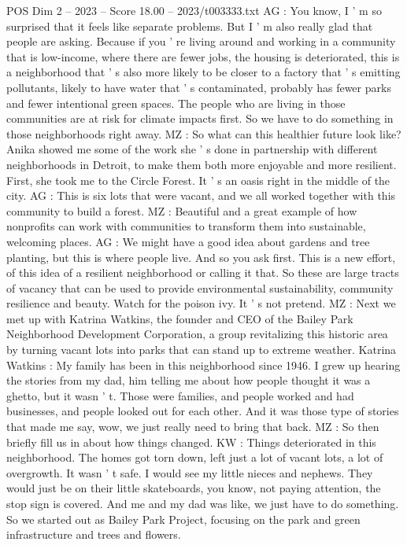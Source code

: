 \begin{textsample}{POS Dim 2 – 2023 – Score 18.00 – 2023/t003333.txt}
AG : You know, I ' m so surprised that it feels like separate problems.
But I ' m also really glad that people are asking.
Because if you ' re living around and working in a community that is low-income, where there are fewer jobs, the housing is deteriorated, this is a neighborhood that ' s also more likely to be closer to a factory that ' s emitting pollutants, likely to have water that ' s contaminated, probably has fewer parks and fewer intentional green spaces.
The people who are living in those communities are at risk for climate impacts first.
So we have to do something in those neighborhoods right away.
MZ : So what can this healthier future look like?
Anika showed me some of the work she ' s done in partnership with different neighborhoods in Detroit, to make them both more enjoyable and more resilient.
First, she took me to the Circle Forest.
It ' s an oasis right in the middle of the city.
AG : This is six lots that were vacant, and we all worked together with this community to build a forest.
MZ : Beautiful and a great example of how nonprofits can work with communities to transform them into sustainable, welcoming places.
AG : We might have a good idea about gardens and tree planting, but this is where people live.
And so you ask first.
This is a new effort, of this idea of a resilient neighborhood or calling it that.
So these are large tracts of vacancy that can be used to provide environmental sustainability, community resilience and beauty.
Watch for the poison ivy.
It ' s not pretend.
MZ : Next we met up with Katrina Watkins, the founder and CEO of the Bailey Park Neighborhood Development Corporation, a group revitalizing this historic area by turning vacant lots into parks that can stand up to extreme weather.
Katrina Watkins : My family has been in this neighborhood since 1946.
I grew up hearing the stories from my dad, him telling me about how people thought it was a ghetto, but it wasn ' t.
Those were families, and people worked and had businesses, and people looked out for each other.
And it was those type of stories that made me say, wow, we just really need to bring that back.
MZ : So then briefly fill us in about how things changed.
KW : Things deteriorated in this neighborhood.
The homes got torn down, left just a lot of vacant lots, a lot of overgrowth.
It wasn ' t safe.
I would see my little nieces and nephews.
They would just be on their little skateboards, you know, not paying attention, the stop sign is covered.
And me and my dad was like, we just have to do something.
So we started out as Bailey Park Project, focusing on the park and green infrastructure and trees and flowers.

\end{textsample}
